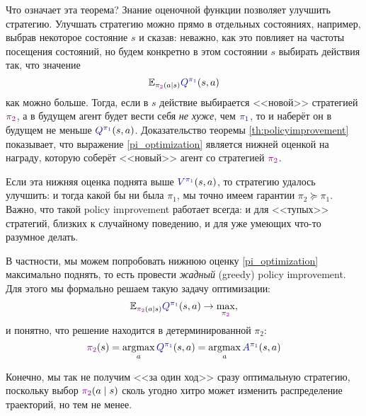 Что означает эта теорема? Знание оценочной функции позволяет улучшить стратегию. Улучшать стратегию можно прямо в отдельных состояниях, например, выбрав некоторое состояние $s$ и сказав: неважно, как это повлияет на частоты посещения состояний, но будем конкретно в этом состоянии $s$ выбирать действия так, что значение
\begin{equation}\label{pi_optimization}
\E_{\textcolor{ChadPurple}{\pi_2}(a \mid s)} \textcolor{ChadBlue}{Q^{\pi_1}}(s, a)    
\end{equation}
как можно больше. Тогда, если в $s$ действие выбирается <<новой>> стратегией $\textcolor{ChadPurple}{\pi_2}$, а в будущем агент будет вести себя \textit{не хуже}, чем $\textcolor{ChadBlue}{\pi_1}$, то и наберёт он в будущем не меньше $\textcolor{ChadBlue}{Q^{\pi_1}}(s, a)$. Доказательство теоремы \ref{th:policyimprovement} показывает, что выражение \eqref{pi_optimization} является нижней оценкой на награду, которую соберёт <<новый>> агент со стратегией $\textcolor{ChadPurple}{\pi_2}$. 

Если эта нижняя оценка поднята выше $\textcolor{ChadBlue}{V^{\pi_1}}(s, a)$, то стратегию удалось улучшить: и тогда какой бы ни была $\pi_1$, мы точно имеем гарантии $\pi_2 \succeq \pi_1$. Важно, что такой policy improvement работает всегда: и для <<тупых>> стратегий, близких к случайному поведению, и для уже умеющих что-то разумное делать.

В частности, мы можем попробовать нижнюю оценку \eqref{pi_optimization} максимально поднять, то есть провести \emph{жадный} (greedy) policy improvement. Для этого мы формально решаем такую задачу оптимизации:
$$
\E_{\textcolor{ChadPurple}{\pi_2}(a \mid s)} \textcolor{ChadBlue}{Q^{\pi_1}}(s, a) \to \max_{\textcolor{ChadPurple}{\pi_2}},
$$
и понятно, что решение находится в детерминированной $\pi_2$:
$$\textcolor{ChadPurple}{\pi_2}(s) = \argmax_{a} \textcolor{ChadBlue}{Q^{\pi_1}}(s, a)= \argmax_{a} \textcolor{ChadBlue}{A^{\pi_1}}(s, a)$$


Конечно, мы так не получим <<за один ход>> сразу оптимальную стратегию, поскольку выбор $\textcolor{ChadPurple}{\pi_2}(a \mid s)$ сколь угодно хитро может изменить распределение траекторий, но тем не менее.



